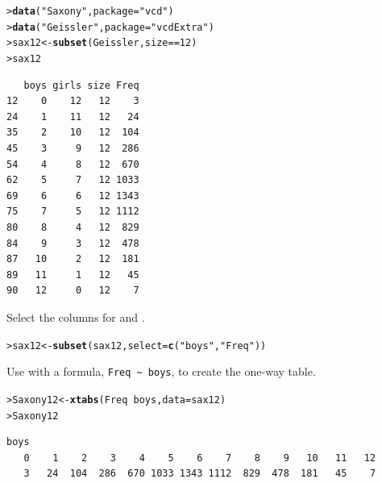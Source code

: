 \documentclass[10pt]{report}\usepackage[]{graphicx}\usepackage[]{color}
\makeatletter
\newcommand{\hlnum}[1]{\textcolor[rgb]{0.686,0.059,0.569}{#1}}%
\newcommand{\hlstr}[1]{\textcolor[rgb]{0.192,0.494,0.8}{#1}}%
\newcommand{\hlopt}[1]{\textcolor[rgb]{0,0,0}{#1}}%
\newcommand{\hlstd}[1]{\textcolor[rgb]{0.345,0.345,0.345}{#1}}%
\newcommand{\hlkwb}[1]{\textcolor[rgb]{0.69,0.353,0.396}{#1}}%
\newcommand{\hlkwc}[1]{\textcolor[rgb]{0.333,0.667,0.333}{#1}}%
\newcommand{\hlkwd}[1]{\textcolor[rgb]{0.737,0.353,0.396}{\textbf{#1}}}%
\newenvironment{kframe}{%
 \def\at@end@of@kframe{}%
 \ifinner\ifhmode%
  \def\at@end@of@kframe{\end{minipage}}%
  \begin{minipage}{\columnwidth}%
 \fi\fi%
 \def\FrameCommand##1{\hskip\@totalleftmargin \hskip-\fboxsep
 \colorbox{shadecolor}{##1}\hskip-\fboxsep
     \hskip-\linewidth \hskip-\@totalleftmargin \hskip\columnwidth}%
 \MakeFramed {\advance\hsize-\width
   \@totalleftmargin\z@ \linewidth\hsize
   \@setminipage}}%
 {\par\unskip\endMakeFramed%
 \at@end@of@kframe}
\newenvironment{knitrout}{}{} %
\renewenvironment{knitrout}{\small\renewcommand{\baselinestretch}{.85}}{} %
\makeatother
\begin{document}
\begin{Exercises}
\begin{enumerate*}
\begin{ans}
\begin{knitrout}
\begin{kframe}
\begin{alltt}
\hlstd{> }\hlkwd{data}\hlstd{(}\hlstr{"Saxony"}\hlstd{,} \hlkwc{package}\hlstd{=}\hlstr{"vcd"}\hlstd{)}
\hlstd{> }\hlkwd{data}\hlstd{(}\hlstr{"Geissler"}\hlstd{,} \hlkwc{package}\hlstd{=}\hlstr{"vcdExtra"}\hlstd{)}
\hlstd{> }\hlstd{sax12} \hlkwb{<-} \hlkwd{subset}\hlstd{(Geissler, size}\hlopt{==}\hlnum{12}\hlstd{)}
\hlstd{> }\hlstd{sax12}
\end{alltt}
\begin{verbatim}
   boys girls size Freq
12    0    12   12    3
24    1    11   12   24
35    2    10   12  104
45    3     9   12  286
54    4     8   12  670
62    5     7   12 1033
69    6     6   12 1343
75    7     5   12 1112
80    8     4   12  829
84    9     3   12  478
87   10     2   12  181
89   11     1   12   45
90   12     0   12    7
\end{verbatim}
\end{kframe}
\end{knitrout}
    \end{ans}
    
    \item Select the columns for  and .
    \begin{ans}
\begin{knitrout}\footnotesize
{}\color{fgcolor}\begin{kframe}
\begin{alltt}
\hlstd{> }\hlstd{sax12} \hlkwb{<-} \hlkwd{subset}\hlstd{(sax12,} \hlkwc{select}\hlstd{=}\hlkwd{c}\hlstd{(}\hlstr{"boys"}\hlstd{,}\hlstr{"Freq"}\hlstd{))}
\end{alltt}
\end{kframe}
\end{knitrout}
    \end{ans}
    
    \item Use  with a formula, \verb|Freq ~ boys|, to create the
    one-way table.
    \begin{ans}
\begin{knitrout}\footnotesize
{}\color{fgcolor}\begin{kframe}
\begin{alltt}
\hlstd{> }\hlstd{Saxony12}\hlkwb{<-}\hlkwd{xtabs}\hlstd{(Freq}\hlopt{~}\hlstd{boys,} \hlkwc{data}\hlstd{=sax12)}
\hlstd{> }\hlstd{Saxony12}
\end{alltt}
\begin{verbatim}
boys
   0    1    2    3    4    5    6    7    8    9   10   11   12 
   3   24  104  286  670 1033 1343 1112  829  478  181   45    7 
\end{verbatim}
\end{kframe}
\end{knitrout}
    \end{ans}
    

\end{enumerate*}
\end{Exercises}
\end{document}
